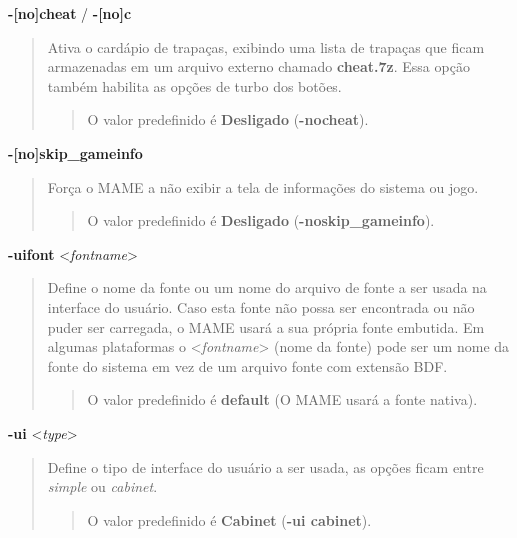\documentclass[letterpaper,10pt,brazil]{sphinxmanual}
\begin{document}
\label{commandline/commandline-all:mame-commandline-cheat}
\textbf{-{[}no{]}cheat} / \textbf{-{[}no{]}c}
\begin{quote}

Ativa o cardápio de trapaças, exibindo uma lista de trapaças que
ficam armazenadas em um arquivo externo chamado \textbf{cheat.7z}.
Essa opção também habilita as opções de turbo dos botões.
\begin{quote}

O valor predefinido é \textbf{Desligado} (\textbf{-nocheat}).
\end{quote}
\end{quote}
\label{commandline/commandline-all:mame-commandline-skipgameinfo}
\textbf{-{[}no{]}skip\_gameinfo}
\begin{quote}

Força o MAME a não exibir a tela de informações do sistema ou jogo.
\begin{quote}

O valor predefinido é \textbf{Desligado} (\textbf{-noskip\_gameinfo}).
\end{quote}
\end{quote}
\label{commandline/commandline-all:mame-commandline-uifont}
\textbf{-uifont} \textless{}\emph{fontname}\textgreater{}
\begin{quote}

Define o nome da fonte ou um nome do arquivo de fonte a ser usada na
interface do usuário. Caso esta fonte não possa ser encontrada ou
não puder ser carregada, o MAME usará a sua própria fonte embutida.
Em algumas plataformas o \textless{}\emph{fontname}\textgreater{} (nome da fonte) pode ser um
nome da fonte do sistema em vez de um arquivo fonte com extensão
BDF.
\begin{quote}

O valor predefinido é \textbf{default} (O MAME usará a fonte nativa).
\end{quote}
\end{quote}
\label{commandline/commandline-all:mame-commandline-ui}
\textbf{-ui} \textless{}\emph{type}\textgreater{}
\begin{quote}

Define o tipo de interface do usuário a ser usada, as opções ficam
entre \emph{simple} ou \emph{cabinet}.
\begin{quote}

O valor predefinido é \textbf{Cabinet} (\textbf{-ui cabinet}).
\end{quote}
\end{quote}
\end{document}
